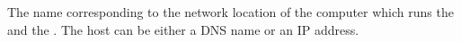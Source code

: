 \item[AUT Agent Host]{
The name corresponding to the network location of the computer which runs the \gdagent{} and the \gdaut{}. The host can be either a DNS name or an IP address.
}
